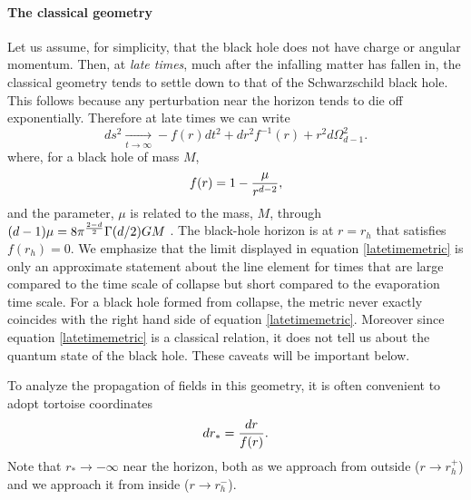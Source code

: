 \documentclass[12pt]{article}
\def\gnewt{G}
\def\rtor{{r_*}}
\newcommand{\be}{\begin{equation}}
\newcommand{\ee}{\end{equation}}
\begin{document}
\paragraph{\bf The classical geometry \\}
Let us assume, for simplicity, that the black hole does not have charge or angular momentum. Then,  at {\em late times}, much after the infalling matter has fallen in,  the classical geometry tends to settle down to that of the Schwarzschild black hole. This follows because any perturbation near the horizon tends to die off exponentially. Therefore at late times we can write
\be
\label{latetimemetric}
ds^2 \underset{t \rightarrow \infty}{\longrightarrow} -f(r) dt^2 + dr^2 f^{-1}(r) + r^2 d \Omega_{d-1}^2.
\ee
where, for a black hole of mass $M$,
\be
\label{fexplicit}
f(r) = {1 - {\mu \over r^{d-2}}},
\ee
and the parameter, $\mu$ is related to the mass, $M$,  through $(d-1) \mu = 8 \pi^{{2-d \over 2}} \Gamma(d/2)  \gnewt M$ \cite{lrr-2008-6}. The black-hole horizon is at $r = r_h$ that satisfies $f(r_h) = 0$.
We emphasize that the limit displayed in equation \eqref{latetimemetric} is only an approximate statement about the line element for times that are large compared to the time scale of collapse but short compared to the evaporation time scale. For a black hole formed from collapse, the metric never exactly coincides with the right hand side of equation \eqref{latetimemetric}. Moreover since equation \eqref{latetimemetric} is a classical relation,  it does not tell us about the quantum state of the black hole. These caveats will be important below.

To analyze the propagation of fields in this geometry, it is often convenient to adopt tortoise coordinates
\be
d \rtor = {d r \over f(r)}.
\ee
Note that $\rtor \rightarrow -\infty$ near the horizon, both as we approach from outside ($r \rightarrow r_h^+$) and we approach it from inside ($r \rightarrow r_h^-$).
\end{document}
